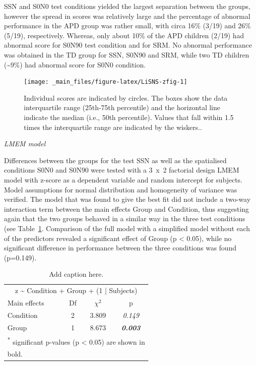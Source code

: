 \documentclass[a4paper, twoside]{templates/ociamthesis}
\begin{document}
SSN and S0N0 test conditions yielded the largest separation between the groups, however the spread in scores was relatively large and the percentage of abnormal performance in the APD group was rather small, with circa 16\% (3/19) and 26\% (5/19), respectively. Whereas, only about 10\% of the APD children (2/19) had abnormal score for S0N90 test condition and for SRM. No abnormal performance was obtained in the TD group for SSN, S0N90 and SRM, while two TD children (\textasciitilde9\%) had abnormal score for S0N0 condition.

\begin{figure}

{\centering \texttt{[image: \_main\_files/figure-latex/LiSNS-zfig-1]} 

}

\caption{Individual scores are indicated by circles. The boxes show the data interquartile range (25th-75th percentile) and the horizontal line indicate the median (i.e., 50th percentile). Values that fall within 1.5 times the interquartile range are indicated by the wiskers..}\label{fig:LiSNS-zfig}
\end{figure}

\colorbox[HTML]{CCCCFF}{\emph{LMEM model}}

Differences between the groups for the test SSN as well as the spatialised conditions S0N0 and S0N90 were tested with a 3~x~2 factorial design LMEM model with z-score as a dependent variable and random intercept for subjects. Model assumptions for normal distribution and homogeneity of variance was verified. The model that was found to give the best fit did not include a two-way interaction term between the main effects Group and Condition, thus suggesting again that the two groups behaved in a similar way in the three test conditions (see Table~\ref{tab:LiSNS-zLMEM}. Comparison of the full model with a simplified model without each of the predictors revealed a significant effect of Group (p \textless{} 0.05), while no significant difference in performance between the three conditions was found (p=0.149).

\begin{table}

\caption{\label{tab:LiSNS-zLMEM}Add caption here.}
\centering
\begin{tabular}[t]{lcc>{}c}
\toprule
\multicolumn{4}{c}{z \textasciitilde{} Condition + Group + (1 | Subjects)} \\
\cmidrule(l{3pt}r{3pt}){1-4}
Main effects & Df & $\chi^{2}$ & p\\
\midrule
Condition & 2 & 3.809 & \em{0.149}\\
Group & 1 & 8.673 & \em{\textbf{0.003}}\\
\bottomrule
\multicolumn{4}{l}{\textsuperscript{*} significant p-values (p < 0.05) are shown in}\\
\multicolumn{4}{l}{bold.}\\
\end{tabular}
\end{table}
\end{document}
